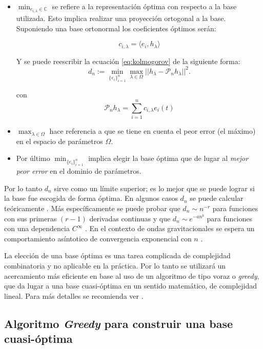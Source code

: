 \begin{itemize}
\item $\min_{ c_{i,\lambda} \in \mathbb{C}}$ se refiere a la representación óptima con respecto a la base utilizada. Esto implica realizar una proyección ortogonal a la base. Suponiendo una base ortonormal los coeficientes óptimos serán:

\begin{equation} \label{eq:coefs}
c_{i, \lambda} = \langle e_i, h_{\lambda} \rangle 
\end{equation}

Y se puede reescribir la ecuación \eqref{eq:kolmogorov} de la siguiente forma:
\[
d_n := \min_{\{e_i\}_{i=1}^n} \max_{\lambda \in \Omega} || h_{\lambda} - \mathcal{P}_nh_{\lambda} ||^2.
\]

con 
\begin{equation}
\mathcal{P}_nh_{\lambda} = \sum_{i=1}^{n} c_{i,\lambda} e_i(t)
\end{equation}

\item $\max_{\lambda \in \Omega}$ hace referencia a que se tiene en cuenta el peor error (el máximo) en el espacio de parámetros $\Omega$. 
\item Por último $\min_{\{e_i\}_{i=1}^n}$ implica elegir la base óptima que de lugar al \textit{mejor peor error} en el dominio de parámetros.
\end{itemize}

Por lo tanto $d_n$ sirve como un límite superior; es lo mejor que se puede lograr si la base fue escogida de forma óptima.
En algunos casos $d_n$ se puede calcular teóricamente \cite{MAGARILILYAEV200197}. Más específicamente se puede probar que $d_n \sim n^{-r}$ para funciones con sus primeras $(r-1)$ derivadas continuas y que $d_n \sim e^{-an^b}$ para funciones con una dependencia $C^{\infty}$  \cite{articleg}. En el contexto de ondas gravitacionales se espera un comportamiento asíntotico de convergencia exponencial con $n$ \citep{PhysRevX.4.031006, Herrmann:2012xpx}.

La elección de una base óptima es una tarea complicada de complejidad combinatoria y no aplicable en la práctica. Por lo tanto se utilizará un acercamiento más eficiente en base al uso de un algoritmo de tipo voraz o \textit{greedy}, que da lugar a una base cuasi-óptima en un sentido matemático, de complejidad lineal. Para más detalles se recomienda ver \cite{Tiglio:2021ysj}.

\subsection{Algoritmo \textit{Greedy} para construir una base cuasi-óptima}

